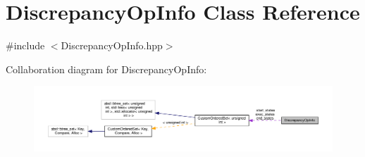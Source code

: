 \hypertarget{classDiscrepancyOpInfo}{}\section{Discrepancy\+Op\+Info Class Reference}
\label{classDiscrepancyOpInfo}


{\ttfamily \#include $<$Discrepancy\+Op\+Info.\+hpp$>$}



Collaboration diagram for Discrepancy\+Op\+Info\+:
\nopagebreak
\begin{figure}[H]
\begin{center}
\leavevmode
\includegraphics[width=350pt]{d5/dc3/classDiscrepancyOpInfo__coll__graph}
\end{center}
\end{figure}
